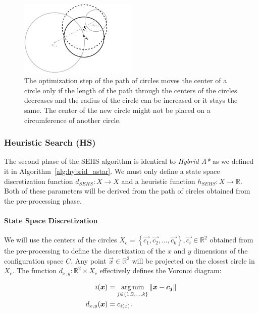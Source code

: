 \begin{figure}
	\centering
	\includegraphics[width=0.5\textwidth]{../img/se_optimization_step}
	\caption{The optimization step of the path of circles moves the center of a circle only if the length of the path through the centers of the circles decreases and the radius of the circle can be increased or it stays the same. The center of the new circle might not be placed on a circumference of another circle.}
	\label{fig:sehs_space_exploration_optimization}
\end{figure}

\subsubsection{Heuristic Search (HS)}

The second phase of the \gls*{SEHS} algorithm is identical to \textit{Hybrid A*} as we defined it in Algorithm~\ref{alg:hybrid_astar}. We must only define a state space discretization function $d_{SEHS}: X\rightarrow X$ and a heuristic function $h_{SEHS}: X\rightarrow \mathbb{R}$. Both of these parameters will be derived from the path of circles obtained from the pre-processing phase.

\paragraph{State Space Discretization}
We will use the centers of the circles $X_c=\left\{\vec{c_1}, \vec{c_2}, \ldots, \vec{c_k} \right\}, \vec{c_i}\in\mathbb{R}^2$ obtained from the pre-processing to define the discretization of the $x$ and $y$ dimensions of the configuration space $C$. Any point $\vec{x}\in \mathbb{R}^2$ will be projected on the closest circle in $X_c$. The function $d_{x,y}:\mathbb{R}^2\times X_c$ effectively defines the Voronoi diagram:

\begin{equation*}
\begin{aligned}
i(\bm{x})&=\operatorname*{arg\,min}_{j\in \left\{1, 2, \ldots, k\right\}} \left\lVert\bm{x}-\bm{c_j}\right\rVert \\
d_{x,y}(\bm{x})&=c_{i(x)}.
\end{aligned}
\end{equation*}

